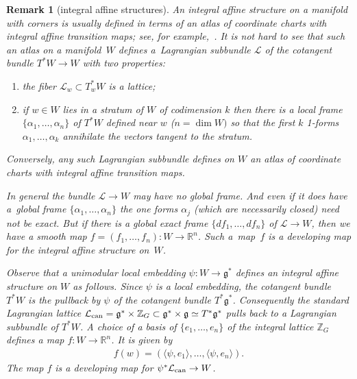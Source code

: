 \documentclass[10pt,a4paper]{amsart}
\numberwithin{equation}{section}
\newtheorem{Remark}[Lemma]{Remark}
\begin{document}
\begin{Remark}[integral af\/f\/ine structures]
\label{add_rk:2}
An integral af\/f\/ine structure on a manifold with corners is usually
def\/ined in terms of an atlas of coordinate charts with integral af\/f\/ine
transition maps; see, for example,~\cite{Y}.  It is not hard to see
that such an atlas on a manifold~$W$ def\/ines  a~Lagrangian subbundle
${\mathcal L}$ of the cotangent bundle $T^*W\to W$ with two properties:
\begin{enumerate}[1)]\itemsep=0pt
\item the f\/iber ${\mathcal L}_w \subset T^*_wW$ is a lattice;
\item if $w\in W$ lies in a stratum of $W$ of
  codimension $k$ then there is a local frame $\{\alpha_1, \ldots,
  \alpha_n\}$ of $T^*W$ def\/ined near $w$ ($n=\dim W)$ so that the
  f\/irst $k$ 1-forms $\alpha_1,\ldots, \alpha_k$ annihilate the vectors
  tangent to the stratum.
\end{enumerate}
Conversely, any such Lagrangian subbundle def\/ines on $W$ an atlas of
coordinate charts with integral af\/f\/ine transition maps.

In general the  bundle ${\mathcal L}\to W$ may have no global
frame.  And even if it does have a~global frame $\{\alpha_1, \ldots,
\alpha_n\}$ the one forms $\alpha_j$ (which are necessarily closed)
need not be exact.  But if there is a global exact frame
$\{df_1,\ldots, df_n\}$ of ${\mathcal L}\to W$, then we have a smooth map
$f=(f_1,\ldots, f_n)\colon W\to {\mathbb R}^n$.  Such a~map~$f$ is a developing
map for the integral af\/f\/ine structure on~$W$.

Observe that a unimodular local embedding $\psi\colon W\to {\mathfrak g}^*$
def\/ines an integral af\/f\/ine structure on $W$ as follows. Since $\psi$
is a local embedding, the cotangent bundle $T^*W$ is the pullback by
$\psi$ of the cotangent bundle $T^*{\mathfrak g}^*$.  Consequently the standard
Lagrangian lattice ${\mathcal L}_{\rm can} ={\mathfrak g}^* \times {\mathbb Z}_G \subset {\mathfrak g}^*
\times {\mathfrak g}\simeq T^*{\mathfrak g}^*$ pulls back to a Lagrangian subbundle of
$T^*W$.  A choice of a basis of $\{e_1,\ldots, e_n\}$ of the integral
lattice ${\mathbb Z}_G$ def\/ines a map $f\colon W\to {\mathbb R}^n$.  It is given by
\begin{gather*}
f(w) = (\langle \psi, e_1\rangle, \ldots, \langle \psi, e_n\rangle).
\end{gather*}
The map $f$ is a developing map for $\psi^*{\mathcal L}_{\rm can}\to W$.
\end{Remark}
\end{document}
